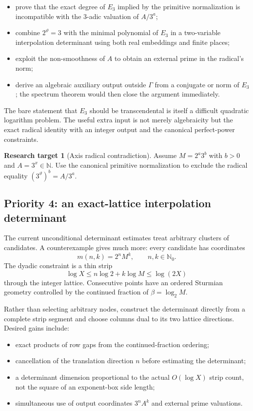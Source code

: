\documentclass[11pt,oneside]{article}
\theoremstyle{definition}
\newtheorem{problem}[theorem]{Research target}
\theoremstyle{remark}
\newcommand{\N}{\mathbb N}
\newcommand{\Nzero}{\mathbb N_0}
\begin{document}
\begin{itemize}
\item prove that the exact degree of $E_3$ implied by the primitive normalization is
      incompatible with the $3$-adic valuation of $A/3^a$;
\item combine $2^{\vartheta}=3$ with the minimal polynomial of $E_3$ in a two-variable
      interpolation determinant using both real embeddings and finite places;
\item exploit the non-smoothness of $A$ to obtain an external prime in the radical's norm;
\item derive an algebraic auxiliary output outside $\Gamma$ from a conjugate or norm of
      $E_3$; the spectrum theorem would then close the argument immediately.
\end{itemize}

The bare statement that $E_3$ should be transcendental is itself a difficult quadratic
logarithm problem.  The useful extra input is not merely algebraicity but the exact radical
identity with an integer output and the canonical perfect-power constraints.

\begin{problem}[Axis radical contradiction]
Assume $M=2^a3^b$ with $b>0$ and $A=3^x\in\N$.  Use the canonical primitive normalization to
exclude the radical equality $(3^{\vartheta})^b=A/3^a$.
\end{problem}

\subsection{Priority 4: an exact-lattice interpolation determinant}

The current unconditional determinant estimates treat arbitrary clusters of candidates.  A
counterexample gives much more: every candidate has coordinates
\[
  m(n,k)=2^nM^k,
  \qquad n,k\in\Nzero.
\]
The dyadic constraint is a thin strip
\[
  \log X\le n\log2+k\log M\le\log(2X)
\]
through the integer lattice.  Consecutive points have an ordered Sturmian geometry controlled
by the continued fraction of $\beta=\log_2M$.

Rather than selecting arbitrary nodes, construct the determinant directly from a complete
strip segment and choose columns dual to its two lattice directions.  Desired gains include:

\begin{itemize}
\item exact products of row gaps from the continued-fraction ordering;
\item cancellation of the translation direction $n$ before estimating the determinant;
\item a determinant dimension proportional to the actual $O(\log X)$ strip count, not the
      square of an exponent-box side length;
\item simultaneous use of output coordinates $3^nA^k$ and external prime valuations.
\end{itemize}
\end{document}
